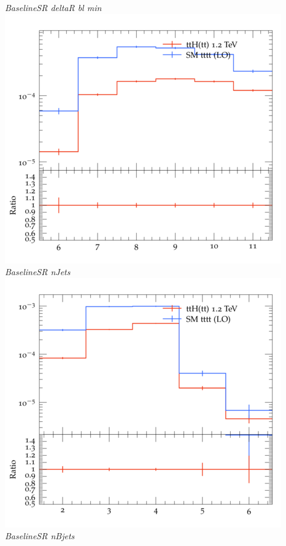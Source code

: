 \documentclass{beamer}
\begin{document}
\begin{frame}
\begin{columns}
\textit{\small BaselineSR deltaR bl min}
\includegraphics[width=\textwidth]{../plots/ttH_1200/tttt_ttH_1LOS/BaselineSR_nJets.png}\\
\textit{\small BaselineSR nJets}
\includegraphics[width=\textwidth]{../plots/ttH_1200/tttt_ttH_1LOS/BaselineSR_nBjets.png}\\
\textit{\small BaselineSR nBjets}
\end{columns}
\end{frame}
\end{document}
